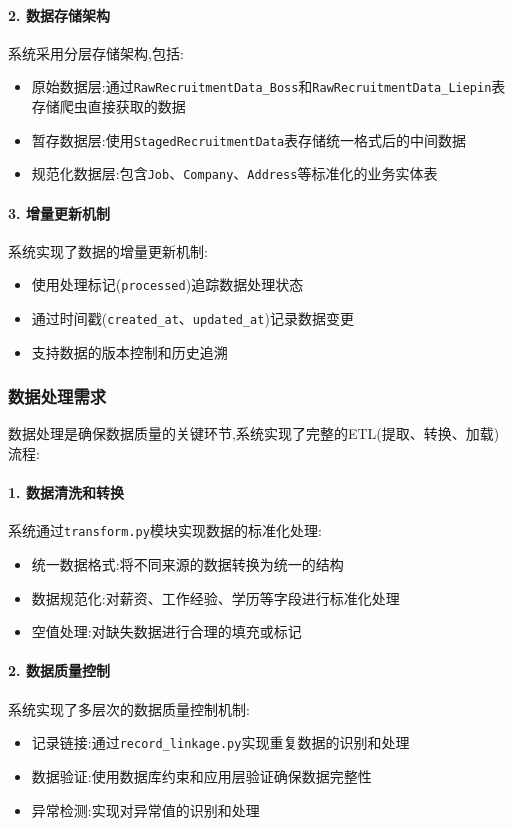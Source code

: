 \paragraph{2. 数据存储架构}
系统采用分层存储架构,包括:
\begin{itemize}
    \item 原始数据层:通过\texttt{RawRecruitmentData\_Boss}和\texttt{RawRecruitmentData\_Liepin}表存储爬虫直接获取的数据
    \item 暂存数据层:使用\texttt{StagedRecruitmentData}表存储统一格式后的中间数据
    \item 规范化数据层:包含\texttt{Job}、\texttt{Company}、\texttt{Address}等标准化的业务实体表
\end{itemize}

\paragraph{3. 增量更新机制}
系统实现了数据的增量更新机制:
\begin{itemize}
    \item 使用处理标记(\texttt{processed})追踪数据处理状态
    \item 通过时间戳(\texttt{created\_at}、\texttt{updated\_at})记录数据变更
    \item 支持数据的版本控制和历史追溯
\end{itemize}

\subsubsection{数据处理需求}

数据处理是确保数据质量的关键环节,系统实现了完整的ETL(提取、转换、加载)流程:

\paragraph{1. 数据清洗和转换}
系统通过\texttt{transform.py}模块实现数据的标准化处理:
\begin{itemize}
    \item 统一数据格式:将不同来源的数据转换为统一的结构
    \item 数据规范化:对薪资、工作经验、学历等字段进行标准化处理
    \item 空值处理:对缺失数据进行合理的填充或标记
\end{itemize}

\paragraph{2. 数据质量控制}
系统实现了多层次的数据质量控制机制:
\begin{itemize}
    \item 记录链接:通过\texttt{record\_linkage.py}实现重复数据的识别和处理
    \item 数据验证:使用数据库约束和应用层验证确保数据完整性
    \item 异常检测:实现对异常值的识别和处理
\end{itemize}

